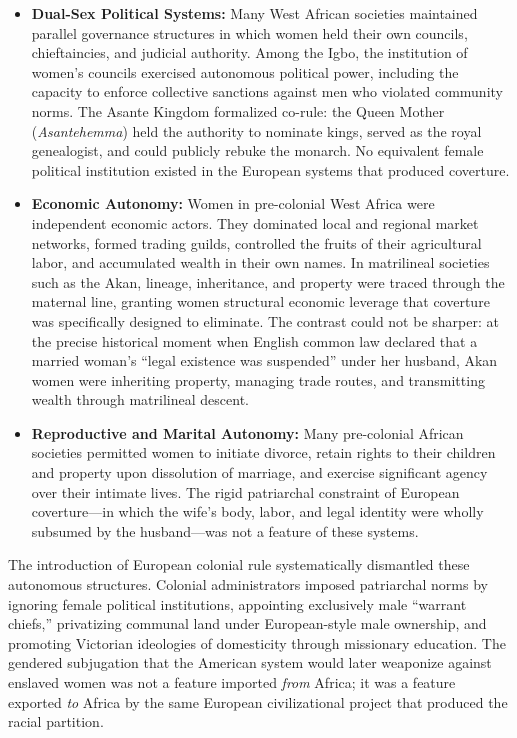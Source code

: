 \documentclass[12pt,openany]{book}
\begin{document}
\begin{itemize}
    \item \textbf{Dual-Sex Political Systems:} Many West African societies maintained parallel governance structures in which women held their own councils, chieftaincies, and judicial authority. Among the Igbo, the institution of women's councils exercised autonomous political power, including the capacity to enforce collective sanctions against men who violated community norms. The Asante Kingdom formalized co-rule: the Queen Mother (\textit{Asantehemma}) held the authority to nominate kings, served as the royal genealogist, and could publicly rebuke the monarch. No equivalent female political institution existed in the European systems that produced coverture.

    \item \textbf{Economic Autonomy:} Women in pre-colonial West Africa were independent economic actors. They dominated local and regional market networks, formed trading guilds, controlled the fruits of their agricultural labor, and accumulated wealth in their own names. In matrilineal societies such as the Akan, lineage, inheritance, and property were traced through the maternal line, granting women structural economic leverage that coverture was specifically designed to eliminate. The contrast could not be sharper: at the precise historical moment when English common law declared that a married woman's ``legal existence was suspended'' under her husband, Akan women were inheriting property, managing trade routes, and transmitting wealth through matrilineal descent.

    \item \textbf{Reproductive and Marital Autonomy:} Many pre-colonial African societies permitted women to initiate divorce, retain rights to their children and property upon dissolution of marriage, and exercise significant agency over their intimate lives. The rigid patriarchal constraint of European coverture---in which the wife's body, labor, and legal identity were wholly subsumed by the husband---was not a feature of these systems.
\end{itemize}

The introduction of European colonial rule systematically dismantled these autonomous structures. Colonial administrators imposed patriarchal norms by ignoring female political institutions, appointing exclusively male ``warrant chiefs,'' privatizing communal land under European-style male ownership, and promoting Victorian ideologies of domesticity through missionary education. The gendered subjugation that the American system would later weaponize against enslaved women was not a feature imported \textit{from} Africa; it was a feature exported \textit{to} Africa by the same European civilizational project that produced the racial partition.
\end{document}
